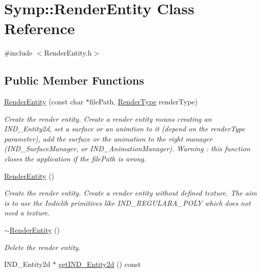 \hypertarget{class_symp_1_1_render_entity}{\section{Symp\-:\-:Render\-Entity Class Reference}
\label{class_symp_1_1_render_entity}
}


{\ttfamily \#include $<$Render\-Entity.\-h$>$}

\subsection*{Public Member Functions}
\begin{DoxyCompactItemize}
\item 
\hyperlink{class_symp_1_1_render_entity_ae2fe86c9be1225441978cc61a1fa8d15}{Render\-Entity} (const char $\ast$file\-Path, \hyperlink{namespace_symp_a1f2e90bddea116ff8d3e9e9b7cd34f37}{Render\-Type} render\-Type)
\begin{DoxyCompactList}\small\item\em Create the render entity. Create a render entity means creating an I\-N\-D\-\_\-\-Entity2d, set a surface or an animtion to it (depend on the render\-Type parameter), add the surface or the animation to the right manager (I\-N\-D\-\_\-\-Surface\-Manager, or I\-N\-D\-\_\-\-Animation\-Manager). Warning \-: this function closes the application if the file\-Path is wrong. \end{DoxyCompactList}\item 
\hyperlink{class_symp_1_1_render_entity_a3fa4ec2a1316e8c20e13021cd8c606d7}{Render\-Entity} ()
\begin{DoxyCompactList}\small\item\em Create the render entity. Create a render entity without defined texture. The aim is to use the Indielib primitives like I\-N\-D\-\_\-\-R\-E\-G\-U\-L\-A\-R\-A\-\_\-\-P\-O\-L\-Y which does not need a texture. \end{DoxyCompactList}\item 
\hyperlink{class_symp_1_1_render_entity_ae452869a384352c13c60db26d1dbc823}{$\sim$\-Render\-Entity} ()
\begin{DoxyCompactList}\small\item\em Delete the render entity. \end{DoxyCompactList}\item 
I\-N\-D\-\_\-\-Entity2d $\ast$ \hyperlink{class_symp_1_1_render_entity_a6adf4a950ce264f59bf3fbbc085aa280}{get\-I\-N\-D\-\_\-\-Entity2d} () const 

\end{DoxyCompactItemize}
